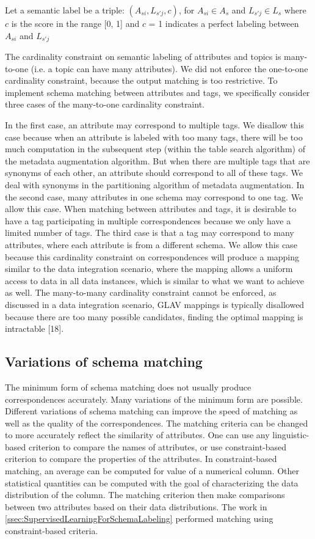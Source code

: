 Let a semantic label be a triple: 
$(A_{si},L_{s'j},c)$, for $A_{si}\in A_{s}$ and $L_{s'j}\in L_{s}$ 
where $c$ is the score in the range {[}0, 1{]} and $c$ = 1 indicates a perfect labeling between $A_{si}$ and $L_{s'j}$

The cardinality constraint on semantic labeling of attributes and topics is many-to-one (i.e. a topic can have many attributes). We did not enforce the one-to-one cardinality constraint, because the output matching is too restrictive. To implement schema matching between attributes and tags, we specifically consider three cases of the many-to-one cardinality constraint.

In the first case, an attribute may correspond to multiple tags. We disallow this case because when an attribute is labeled with too many tags, there will be too much computation in the subsequent step (within the table search algorithm) of the metadata augmentation algorithm. But when there are multiple tags that are synonyms of each other, an attribute should correspond to all of these tags. We deal with synonyms in the partitioning algorithm of metadata augmentation. In the second case, many attributes in one schema may correspond to one tag. We allow this case. When matching between attributes and tags, it is desirable to have a tag participating in multiple correspondences because we only have a limited number of tags. The third case is that a tag may correspond to many attributes, where each attribute is from a different schema. We allow this case because this cardinality constraint on correspondences will produce a mapping similar to the data integration scenario, where the mapping allows a uniform access to data in all data instances, which is similar to what we want to achieve as well. The many-to-many cardinality constraint cannot be enforced, as discussed in a data integration scenario, GLAV mappings is typically disallowed because there are too many possible candidates, finding the optimal mapping is intractable \cite{Ehrig2004QOM}[18].

\subsection{Variations of schema matching}
\label{ssec:VariationsOfSchemaMatching}

The minimum form of schema matching does not usually produce correspondences accurately. Many variations of the minimum form are possible. Different variations of schema matching can improve the speed of matching as well as the quality of the correspondences. The matching criteria can be changed to more accurately reflect the similarity of attributes. One can use any linguistic-based criterion to compare the names of attributes, or use constraint-based criterion to compare the properties of the attributes. In constraint-based matching, an average can be computed for value of a numerical column. Other statistical quantities can be computed with the goal of characterizing the data distribution of the column. The matching criterion then make comparisons between two attributes based on their data distributions. The work in \autoref{ssec:SupervisedLearningForSchemaLabeling} performed matching using constraint-based criteria.


